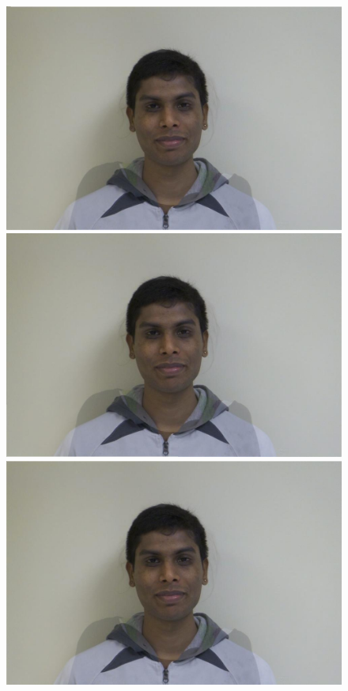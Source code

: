 \documentclass[11pt]{article}
\begin{document}
\begin{figure}[H]
\begin{center}
\includegraphics[scale=0.06]{figs/frames/morph_steinkirch_tangatur_46.jpg} 
\includegraphics[scale=0.06]{figs/frames/morph_steinkirch_tangatur_47.jpg} 
\includegraphics[scale=0.06]{figs/frames/morph_steinkirch_tangatur_48.jpg} 

\end{center}
\end{figure}
\end{document}
